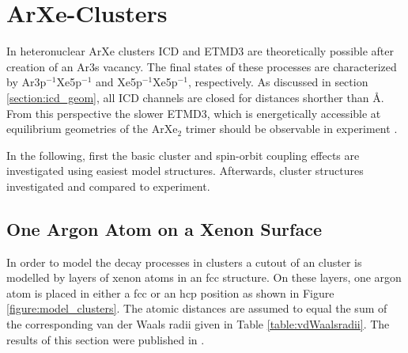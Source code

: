 \section{ArXe-Clusters}
In heteronuclear ArXe clusters \ac{ICD} and \ac{ETMD}3 are theoretically
possible after creation of an Ar3s vacancy. The final states of these processes
are characterized by Ar3p$^{-1}$Xe5p$^{-1}$ and Xe5p$^{-1}$Xe5p$^{-1}$,
respectively. As discussed in section \ref{section:icd_geom}, all \ac{ICD}
channels are closed
for distances shorther than \unit[10]{\AA}. From this perspective the
slower \ac{ETMD}3, which is energetically accessible at equilibrium geometries
of the ArXe$_2$ trimer should be
observable in experiment \cite{Fasshauer10}. 

In the following, first the basic cluster and spin-orbit coupling effects
are investigated using easiest model
structures. Afterwards, cluster structures investigated and compared to experiment.


\subsection{One Argon Atom on a Xenon Surface}
In order to model the decay processes in clusters a cutout of an cluster
is modelled by layers of xenon atoms in an \ac{fcc} structure. On these
layers, one argon atom is placed in either a \ac{fcc} or an \ac{hcp} position
as shown in Figure \ref{figure:model_clusters}. The atomic distances are
assumed to equal the sum of the corresponding van der Waals radii given in
Table \ref{table:vdWaalsradii}. The results of this section were published
in \cite{Fasshauer13}.

